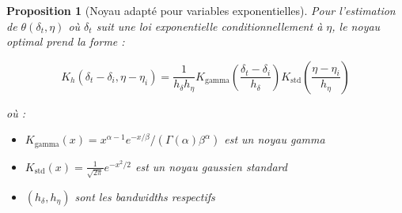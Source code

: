 \documentclass[12pt,a4paper]{article}
\newtheorem{proposition}[theorem]{Proposition}
\theoremstyle{definition}
\theoremstyle{remark}
\begin{document}
\begin{proposition}[Noyau adapté pour variables exponentielles]
    Pour l'estimation de $\theta(\delta_t, \eta)$ où $\delta_t$ suit une loi exponentielle conditionnellement à $\eta$, le noyau optimal prend la forme :
    
    \[
    K_h(\delta_t - \delta_i, \eta - \eta_i) = \frac{1}{h_\delta h_\eta} K_{\text{gamma}}\left(\frac{\delta_t - \delta_i}{h_\delta}\right) K_{\text{std}}\left(\frac{\eta - \eta_i}{h_\eta}\right)
    \]
    
    où :
    \begin{itemize}
        \item $K_{\text{gamma}}(x) = x^{\alpha-1}e^{-x/\beta}/(\Gamma(\alpha)\beta^\alpha)$ est un noyau gamma
        \item $K_{\text{std}}(x) = \frac{1}{\sqrt{2\pi}}e^{-x^2/2}$ est un noyau gaussien standard
        \item $(h_\delta, h_\eta)$ sont les bandwidths respectifs
    \end{itemize}
    \end{proposition}
    
\end{document}
